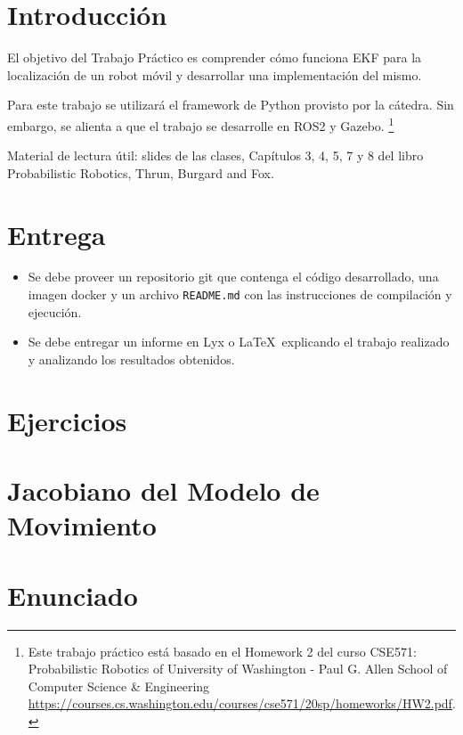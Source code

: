 \documentclass[tp]{lcc}
\begin{document}
	\maketitle
	
	
	\section{Introducción}
	
	El objetivo del Trabajo Práctico es comprender cómo funciona EKF para la localización de un robot móvil y desarrollar una implementación del mismo.
	
	Para este trabajo se utilizará el framework de Python provisto por la cátedra. Sin embargo, se alienta a que el trabajo se desarrolle en ROS2 y Gazebo. \footnote{Este trabajo práctico está basado en el Homework 2 del curso CSE571: Probabilistic Robotics of University of Washington - Paul G. Allen School of Computer Science \& Engineering \url{https://courses.cs.washington.edu/courses/cse571/20sp/homeworks/HW2.pdf}.}
	
	Material de lectura útil: slides de las clases, Capítulos 3, 4, 5, 7 y 8 del libro Probabilistic Robotics, Thrun, Burgard and Fox.
	
	
	\section{Entrega}
	\begin{itemize}
		\item Se debe proveer un repositorio git que contenga el código desarrollado, una imagen docker y un archivo \lstinline{README.md} con las instrucciones de compilación y ejecución.
		
		\item Se debe entregar un informe en Lyx o \LaTeX\  explicando el trabajo realizado y analizando los resultados obtenidos.
	\end{itemize}

	
	\section{Ejercicios}
	
	\section{Jacobiano del Modelo de Movimiento}
	
	\section{Enunciado}
		
\end{document}
